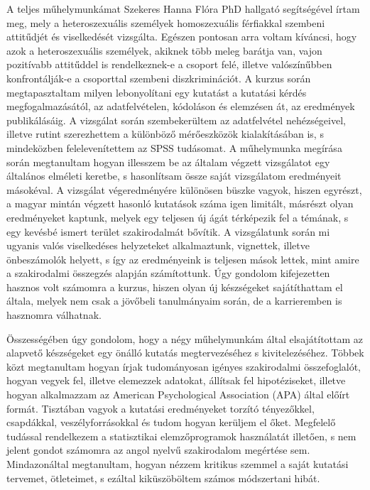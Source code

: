 \par A teljes műhelymunkámat Szekeres Hanna Flóra PhD hallgató segítségével írtam meg, mely a heteroszexuális személyek homoszexuális férfiakkal szembeni attitűdjét és viselkedését vizsgálta. Egészen pontosan arra voltam kíváncsi, hogy azok a heteroszexuális személyek, akiknek több meleg barátja van, vajon pozitívabb attitűddel is rendelkeznek-e a csoport felé, illetve valószínűbben konfrontálják-e a csoporttal szembeni diszkriminációt. A kurzus során megtapasztaltam milyen lebonyolítani egy kutatást a kutatási kérdés megfogalmazásától, az adatfelvételen, kódoláson és elemzésen át, az eredmények publikálásáig. A vizsgálat során szembekerültem az adatfelvétel nehézségeivel, illetve rutint szerezhettem a különböző mérőeszközök kialakításában is, s mindeközben felelevenítettem az SPSS tudásomat. A műhelymunka megírása során megtanultam hogyan illesszem be az általam végzett vizsgálatot egy általános elméleti keretbe, s hasonlítsam össze saját vizsgálatom eredményeit másokéval. A vizsgálat végeredményére különösen büszke vagyok, hiszen egyrészt, a magyar mintán végzett hasonló kutatások száma igen limitált, másrészt olyan eredményeket kaptunk, melyek egy teljesen új ágát térképezik fel a témának, s egy kevésbé ismert terület szakirodalmát bővítik. A vizsgálatunk során mi ugyanis valós viselkedéses helyzeteket alkalmaztunk, vignettek, illetve önbeszámolók helyett, s így az eredményeink is teljesen mások lettek, mint amire a szakirodalmi összegzés alapján számítottunk. Úgy gondolom kifejezetten hasznos volt számomra a kurzus, hiszen olyan új készségeket sajátíthattam el általa, melyek nem csak a jövőbeli tanulmányaim során, de a karrieremben is hasznomra válhatnak.
\\
\par Összességében úgy gondolom, hogy a négy műhelymunkám által elsajátítottam az alapvető készségeket egy önálló kutatás megtervezéséhez s kivitelezéséhez. Többek közt megtanultam hogyan írjak tudományosan igényes szakirodalmi összefoglalót, hogyan vegyek fel, illetve elemezzek adatokat, állítsak fel hipotéziseket, illetve hogyan alkalmazzam az American Psychological Association (APA) által előírt formát. Tisztában vagyok a kutatási eredményeket torzító tényezőkkel, csapdákkal, veszélyforrásokkal és tudom hogyan kerüljem el őket. Megfelelő tudással rendelkezem a statisztikai elemzőprogramok használatát illetően, s nem jelent gondot számomra az angol nyelvű szakirodalom megértése sem. Mindazonáltal megtanultam, hogyan nézzem kritikus szemmel a saját kutatási tervemet, ötleteimet, s ezáltal kiküszöböltem számos módszertani hibát. 

